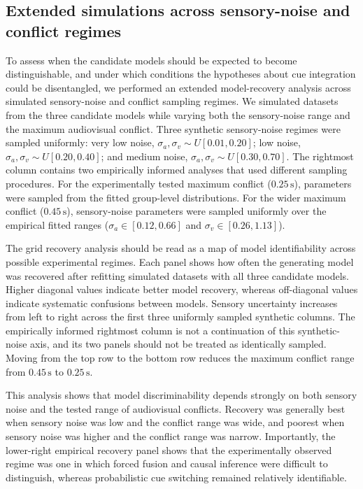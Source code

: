 \documentclass{biorxiv}
\begin{document}

\subsection{Extended simulations across sensory-noise and conflict regimes}

To assess when the candidate models should be expected to become distinguishable, and under which conditions the hypotheses about cue integration could be disentangled, we performed an extended model-recovery analysis across simulated sensory-noise and conflict sampling regimes. We simulated datasets from the three candidate models while varying both the sensory-noise range and the maximum audiovisual conflict. Three synthetic sensory-noise regimes were sampled uniformly: very low noise, $\sigma_a,\sigma_v \sim U[0.01,0.20]$; low noise, $\sigma_a,\sigma_v \sim U[0.20,0.40]$; and medium noise, $\sigma_a,\sigma_v \sim U[0.30,0.70]$. The rightmost column contains two empirically informed analyses that used different sampling procedures. For the experimentally tested maximum conflict ($0.25\,\mathrm{s}$), parameters were sampled from the fitted group-level distributions. For the wider maximum conflict ($0.45\,\mathrm{s}$), sensory-noise parameters were sampled uniformly over the empirical fitted ranges ($\sigma_a \in [0.12,0.66]$ and $\sigma_v \in [0.26,1.13]$).

The grid recovery analysis should be read as a map of model identifiability across possible experimental regimes. Each panel shows how often the generating model was recovered after refitting simulated datasets with all three candidate models. Higher diagonal values indicate better model recovery, whereas off-diagonal values indicate systematic confusions between models. Sensory uncertainty increases from left to right across the first three uniformly sampled synthetic columns. The empirically informed rightmost column is not a continuation of this synthetic-noise axis, and its two panels should not be treated as identically sampled. Moving from the top row to the bottom row reduces the maximum conflict range from $0.45\,\mathrm{s}$ to $0.25\,\mathrm{s}$.

This analysis shows that model discriminability depends strongly on both sensory noise and the tested range of audiovisual conflicts. Recovery was generally best when sensory noise was low and the conflict range was wide, and poorest when sensory noise was higher and the conflict range was narrow. Importantly, the lower-right empirical recovery panel shows that the experimentally observed regime was one in which forced fusion and causal inference were difficult to distinguish, whereas probabilistic cue switching remained relatively identifiable.
\end{document}
